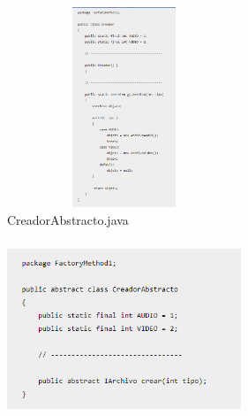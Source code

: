 \documentclass[twoside,twocolumn]{article}
\begin{document}
\begin{itemize}
\\\includegraphics[width=7cm, height=6cm]{imagenes/Cod3.png}
\\CreadorAbstracto.java
\\\includegraphics[width=7cm, height=6cm]{imagenes/Cod4.png}


\end{itemize}
\end{document}
